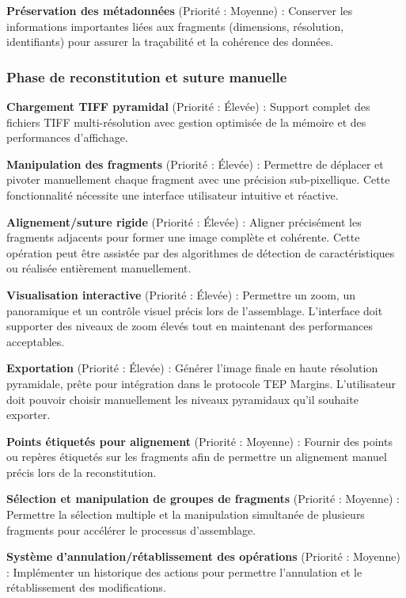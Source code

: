\documentclass[11pt,a4paper]{report}
\begin{document}
\textbf{Préservation des métadonnées} (Priorité : Moyenne) : Conserver les informations importantes liées aux fragments (dimensions, résolution, identifiants) pour assurer la traçabilité et la cohérence des données.

\subsubsection{Phase de reconstitution et suture manuelle}

\textbf{Chargement TIFF pyramidal} (Priorité : Élevée) : Support complet des fichiers TIFF multi-résolution avec gestion optimisée de la mémoire et des performances d'affichage.

\textbf{Manipulation des fragments} (Priorité : Élevée) : Permettre de déplacer et pivoter manuellement chaque fragment avec une précision sub-pixellique. Cette fonctionnalité nécessite une interface utilisateur intuitive et réactive.

\textbf{Alignement/suture rigide} (Priorité : Élevée) : Aligner précisément les fragments adjacents pour former une image complète et cohérente. Cette opération peut être assistée par des algorithmes de détection de caractéristiques ou réalisée entièrement manuellement.

\textbf{Visualisation interactive} (Priorité : Élevée) : Permettre un zoom, un panoramique et un contrôle visuel précis lors de l'assemblage. L'interface doit supporter des niveaux de zoom élevés tout en maintenant des performances acceptables.

\textbf{Exportation} (Priorité : Élevée) : Générer l'image finale en haute résolution pyramidale, prête pour intégration dans le protocole TEP Margins. L'utilisateur doit pouvoir choisir manuellement les niveaux pyramidaux qu'il souhaite exporter.

\textbf{Points étiquetés pour alignement} (Priorité : Moyenne) : Fournir des points ou repères étiquetés sur les fragments afin de permettre un alignement manuel précis lors de la reconstitution.

\textbf{Sélection et manipulation de groupes de fragments} (Priorité : Moyenne) : Permettre la sélection multiple et la manipulation simultanée de plusieurs fragments pour accélérer le processus d'assemblage.

\textbf{Système d'annulation/rétablissement des opérations} (Priorité : Moyenne) : Implémenter un historique des actions pour permettre l'annulation et le rétablissement des modifications.
\end{document}
